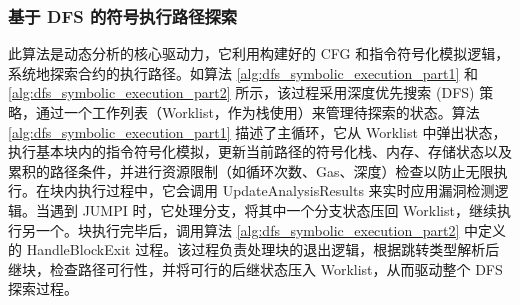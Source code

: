 \documentclass[print, master, vlined, timesmath]{DissertUESTC}
\begin{document}
\subsubsection{基于 DFS 的符号执行路径探索}

此算法是动态分析的核心驱动力，它利用构建好的 CFG 和指令符号化模拟逻辑，系统地探索合约的执行路径。如算法 \ref{alg:dfs_symbolic_execution_part1} 和 \ref{alg:dfs_symbolic_execution_part2} 所示，该过程采用深度优先搜索 (DFS) 策略，通过一个工作列表（Worklist，作为栈使用）来管理待探索的状态。算法 \ref{alg:dfs_symbolic_execution_part1} 描述了主循环，它从 Worklist 中弹出状态，执行基本块内的指令符号化模拟，更新当前路径的符号化栈、内存、存储状态以及累积的路径条件，并进行资源限制（如循环次数、Gas、深度）检查以防止无限执行。在块内执行过程中，它会调用 UpdateAnalysisResults 来实时应用漏洞检测逻辑。当遇到 JUMPI 时，它处理分支，将其中一个分支状态压回 Worklist，继续执行另一个。块执行完毕后，调用算法 \ref{alg:dfs_symbolic_execution_part2} 中定义的 HandleBlockExit 过程。该过程负责处理块的退出逻辑，根据跳转类型解析后继块，检查路径可行性，并将可行的后继状态压入 Worklist，从而驱动整个 DFS 探索过程。
\end{document}
